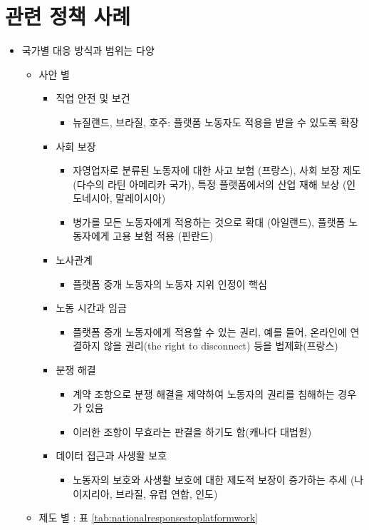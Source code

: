 \section{관련 정책 사례}
\begin{itemize}
\item 국가별 대응 방식과 범위는 다양 
	\begin{itemize}
	\item 사안 별 \citep{International-Labour-Office:2021uk}
		\begin{itemize}
		\item 직업 안전 및 보건
			\begin{itemize}
			\item 뉴질랜드, 브라질, 호주: 플랫폼 노동자도 적용을 받을 수 있도록 확장
			\end{itemize}
		\item 사회 보장
			\begin{itemize}
			\item 자영업자로 분류된 노동자에 대한 사고 보험 (프랑스), 사회 보장 제도 (다수의 라틴 아메리카 국가), 특정 플랫폼에서의 산업 재해 보상 (인도네시아, 말레이시아)
			\item 병가를 모든 노동자에게 적용하는 것으로 확대 (아일랜드), 플랫폼 노동자에게 고용 보험 적용 (핀란드)
			\end{itemize}
		\item 노사관계
			\begin{itemize}
			\item	 플랫폼 중개 노동자의 노동자 지위 인정이 핵심
			\end{itemize}
		\item 노동 시간과 임금
			\begin{itemize}
			\item 플랫폼 중개 노동자에게 적용할 수 있는 권리, 예를 들어, 온라인에 연결하지 않을 권리(the right to disconnect) 등을 법제화(프랑스)
			\end{itemize}	
		\item 분쟁 해결
			\begin{itemize}
			\item 계약 조항으로 분쟁 해결을 제약하여 노동자의 권리를 침해하는 경우가 있음
			\item 이러한 조항이 무효라는 판결을 하기도 함(캐나다 대법원)
			\end{itemize}
		\item 데이터 접근과 사생활 보호	
			\begin{itemize}
			\item 노동자의 보호와 사생활 보호에 대한 제도적 보장이 증가하는 추세 (나이지리아, 브라질, 유럽 연합, 인도)
			\end{itemize}
		\end{itemize}
	\item 제도 별 \citep{Garben:2019vs}: 표 \ref{tab:nationalresponsestoplatformwork}	
	\end{itemize}
	

\end{itemize}
